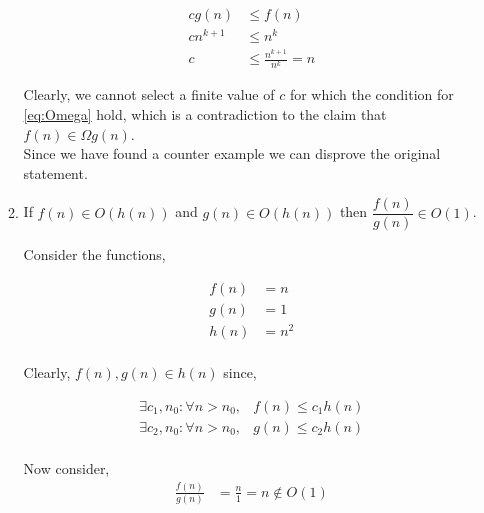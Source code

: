 \begin{enumerate}
\begin{enumerate}
                    \begin{align*}
                        c g \left( n \right) & \le f \left(n \right)         \\
                        c n^{k + 1}          & \le n^k                       \\
                        c                    & \le \frac{n^{k + 1}}{n^k} = n
                    \end{align*}

                    Clearly, we cannot select a finite value of $c$ for which the condition for \ref{eq:Omega} hold, which is
                    a contradiction to the claim that $f \left( n \right) \in \Omega g \left( n \right)$. \\

                    Since we have found a counter example we can disprove the original statement. \\

              \item If $f(n) \in O(h(n))$ and $g(n) \in O(h(n))$ then $\dfrac{f(n)}{g(n)} \in O(1)$.

                    Consider the functions,

                    \begin{align*}
                        f\left(n\right) & = n   \\
                        g\left(n\right) & = 1   \\
                        h\left(n\right) & = n^2 \\
                    \end{align*}

                    Clearly, $f(n), g(n) \in h(n)$ since,

                    \begin{align*}
                        \exists c_1, n_0 : \forall n > n_0, & f\left(n\right) \le c_1 h\left(n\right) \\
                        \exists c_2, n_0 : \forall n > n_0, & g\left(n\right) \le c_2 h\left(n\right) \\
                    \end{align*}

                    Now consider,
                    \begin{align*}
                        \frac{f\left(n\right)}{g\left(n\right)} & = \frac{n}{1} = n \notin O\left(1\right)
                    \end{align*}


\end{enumerate}
\end{enumerate}
